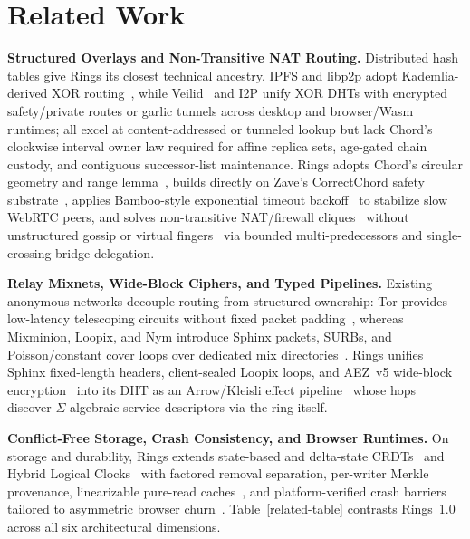 \documentclass[journal]{IEEEtran}
\begin{document}
\section{Related Work}

\textbf{Structured Overlays and Non-Transitive NAT Routing.}
Distributed hash tables give Rings its closest technical ancestry. IPFS and libp2p adopt Kademlia-derived XOR routing~\cite{Kademlia,IPFS,Libp2p}, while Veilid~\cite{Veilid2023} and I2P unify XOR DHTs with encrypted safety/private routes or garlic tunnels across desktop and browser/Wasm runtimes; all excel at content-addressed or tunneled lookup but lack Chord's clockwise interval owner law required for affine replica sets, age-gated chain custody, and contiguous successor-list maintenance. Rings adopts Chord's circular geometry and range lemma~\cite{Chord,Stoica2003}, builds directly on Zave's CorrectChord safety substrate~\cite{Zave2015,ZaveChordCorrect}, applies Bamboo-style exponential timeout backoff~\cite{Rhea2004} to stabilize slow WebRTC peers, and solves non-transitive NAT/firewall cliques~\cite{Freedman2005,Ford2006} without unstructured gossip or virtual fingers~\cite{Bryan2008,RFC6940} via bounded multi-predecessors and single-crossing bridge delegation.

\textbf{Relay Mixnets, Wide-Block Ciphers, and Typed Pipelines.}
Existing anonymous networks decouple routing from structured ownership: Tor provides low-latency telescoping circuits without fixed packet padding~\cite{TorNetwork,Degabriele2018}, whereas Mixminion, Loopix, and Nym introduce Sphinx packets, SURBs, and Poisson/constant cover loops over dedicated mix directories~\cite{Chaum1981,Danezis2003,Danezis2009,Piotrowska2017,NymNetwork}. Rings unifies Sphinx fixed-length headers, client-sealed Loopix loops, and AEZ~v5 wide-block encryption~\cite{Hoang2015,AEZv5,Anderson1996} into its DHT as an Arrow/Kleisli effect pipeline~\cite{Moggi1991,Plotkin2003,Plotkin2009,Hughes2000,Lindley2011,Mokhov2019} whose hops discover $\Sigma$-algebraic service descriptors via the ring itself.

\textbf{Conflict-Free Storage, Crash Consistency, and Browser Runtimes.}
On storage and durability, Rings extends state-based and delta-state CRDTs~\cite{ShapiroCRDT,Almeida2018,Preguica2018} and Hybrid Logical Clocks~\cite{Kulkarni2014,Fidge1988} with factored removal separation, per-writer Merkle provenance, linearizable pure-read caches~\cite{HerlihyWing1990}, and platform-verified crash barriers~\cite{Pillai2014,AppleFsync,MoveFileEx,IndexedDB3} tailored to asymmetric browser churn~\cite{BlakeRodrigues,webrtc-standard,webassembly}. Table~\ref{related-table} contrasts Rings~1.0 across all six architectural dimensions.
\end{document}
